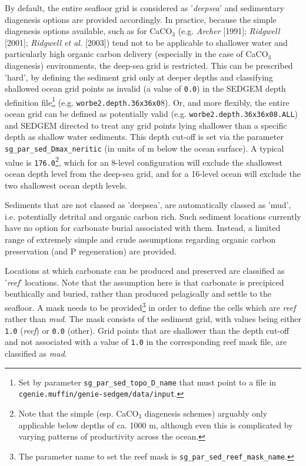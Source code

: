 \documentclass[11pt,fleqn]{book} %
\begin{document}
By default, the entire seafloor grid is considered as '\textit{deepsea}' and sedimentary diagenesis options are provided accordingly. In practice, because the simple diagenesis options available, such as for CaCO\(_{3}\) (e.g. \textit{Archer} [1991]; \textit{Ridgwell} [2001]; \textit{Ridgwell et al.} [2003]) tend not to be applicable to shallower water and particularly high organic carbon delivery (especially in the case of CaCO\(_{3}\) diagenesis) environments, the deep-sea grid is restricted. This can be prescribed 'hard', by defining the sediment grid only at deeper depths and classifying shallowed ocean grid points as invalid (a value of \texttt{0.0}) in the SEDGEM depth definition file\footnote{Set by parameter \texttt{sg\_par\_sed\_topo\_D\_name} that must point to a file in \texttt{cgenie.muffin/genie-sedgem/data/input}.} (e.g. \texttt{worbe2.depth.36x36x0}8).
 Or, and more flexibly, the entire ocean grid can be defined as potentially valid (e.g. \texttt{worbe2.depth.36x36x08.ALL}) and SEDGEM directed to treat any grid points lying shallower than a specific depth as shallow water sediments. This depth cut-off is set via the parameter \texttt{sg\_par\_sed\_Dmax\_neritic} (in units of m below the ocean surface). A typical value is \texttt{176.0}\footnote{Note that the simple (esp. CaCO\(_{3}\) diagenesis schemes) arguably only applicable below depths of ca. 1000 m, although even this is complicated by varying patterns of productivity across the ocean.}, which for an 8-level configuration will exclude the shallowest ocean depth level from the deep-sea grid, and for a 16-level ocean will exclude the two shallowest ocean depth levels.

Sediments that are not classed as 'deepsea', are automatically classed as 'mud', i.e. potentially detrital and organic carbon rich. Such sediment locations  currently have no option for carbonate burial associated with them. Instead, a limited range of extremely simple and crude assumptions regarding organic carbon preservation (and P regeneration) are provided.

Locations at which  carbonate can be produced and preserved
are classified
as '\textit{reef}' locations. Note that the assumption here is that carbonate is precipiced benthically and buried, rather than produced pelagically and  settle to the seafloor.
A mask needs to be provided\footnote{The parameter name to set the reef mask is \texttt{sg\_par\_sed\_reef\_mask\_name}.} in order to define the cells which are \textit{reef} rather than \textit{mud}. The mask consists of the sediment grid, with values being either \texttt{1.0} (\textit{reef}) or \texttt{0.0} (other).  Grid points that are shallower than the depth cut-off and not associated with a value of \texttt{1.0} in the corresponding reef mask file, are classified as \textit{mud}.
\end{document}
